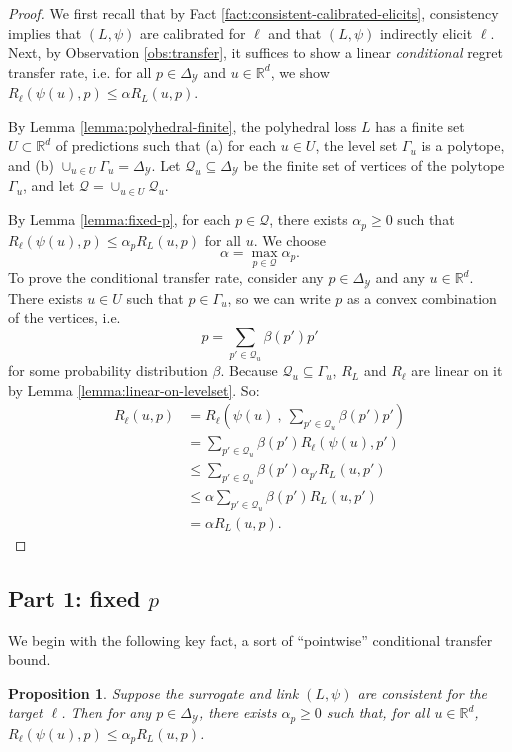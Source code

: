 \documentclass{article}
\newtheorem{proposition}{Proposition}
\newcommand{\reals}{\mathbb{R}}
\newcommand{\simplex}{\Delta_\Y}
\newcommand{\Y}{\mathcal{Y}}
\begin{document}
\begin{proof}
  We first recall that by Fact \ref{fact:consistent-calibrated-elicits}, consistency implies that $(L,\psi)$ are calibrated for $\ell$ and that $(L,\psi)$ indirectly elicit $\ell$.
  Next, by Observation \ref{obs:transfer}, it suffices to show a linear \emph{conditional} regret transfer rate, i.e. for all $p \in \simplex$ and $u \in \reals^d$, we show $R_{\ell}(\psi(u),p) \leq \alpha R_L(u,p)$.
  
  By Lemma \ref{lemma:polyhedral-finite}, the polyhedral loss $L$ has a finite set $U \subset \reals^d$ of predictions such that (a) for each $u \in U$, the level set $\Gamma_u$ is a polytope, and (b) $\cup_{u \in U} \Gamma_u = \simplex$.
  Let $\mathcal{Q}_u \subseteq \simplex$ be the finite set of vertices of the polytope $\Gamma_u$, and let $\mathcal{Q} = \cup_{u \in U} \mathcal{Q}_u$.
  
  By Lemma \ref{lemma:fixed-p}, for each $p \in \mathcal{Q}$, there exists $\alpha_p \geq 0$ such that $R_{\ell}(\psi(u),p) \leq \alpha_p R_L(u,p)$ for all $u$.
  We choose
    \[ \alpha = \max_{p \in \mathcal{Q}} \alpha_p . \]
  To prove the conditional transfer rate, consider any $p \in \simplex$ and any $u \in \reals^d$.
  There exists $u \in U$ such that $p \in \Gamma_u$, so we can write $p$ as a convex combination of the vertices, i.e.
    \[ p = \sum_{p' \in \mathcal{Q}_u} \beta(p') p' \]
  for some probability distribution $\beta$.
  Because $\mathcal{Q}_u \subseteq \Gamma_u$, $R_L$ and $R_{\ell}$ are linear on it by Lemma \ref{lemma:linear-on-levelset}.
  So:
  \begin{align*}
    R_{\ell}(u,p)
    &=    R_{\ell}\left(\psi(u) ~,~ \sum_{p' \in \mathcal{Q}_u} \beta(p') p'\right)  \\
    &=    \sum_{p' \in \mathcal{Q}_u} \beta(p') R_{\ell}(\psi(u),p')  \\
    &\leq \sum_{p' \in \mathcal{Q}_u} \beta(p') \alpha_{p'} R_L(u,p')  \\
    &\leq \alpha \sum_{p' \in \mathcal{Q}_u} \beta(p') R_L(u,p')  \\
    &=    \alpha R_L(u, p) .
  \end{align*}
\end{proof}




\subsection{Part 1: fixed $p$}

We begin with the following key fact, a sort of ``pointwise'' conditional transfer bound.
\begin{proposition} \label{prop:fix-p}
  Suppose the surrogate and link $(L,\psi)$ are consistent for the target $\ell$.
  Then for any $p \in \simplex$, there exists $\alpha_p \geq 0$ such that, for all $u \in \reals^d$, $R_{\ell}(\psi(u),p) \leq \alpha_p R_L(u,p)$.
\end{proposition}
\end{document}
